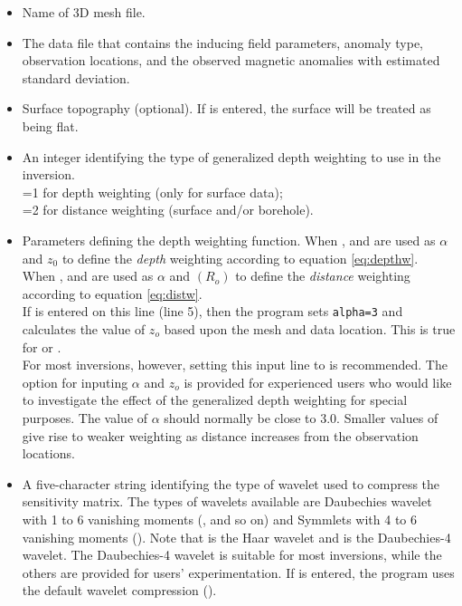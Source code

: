 \begin{itemize}
\item[\fileName{mesh.msh}] Name of 3D mesh file.
\item[\fileName{obs.mag}] The data file that contains the inducing field parameters, anomaly type, observation locations, and the observed magnetic anomalies with estimated standard deviation.
\item[\fileName{topo.dat}] Surface topography (optional). If  is entered, the surface will be treated as being flat.
\item[\fileName{iwt}] An integer identifying the type of generalized depth weighting to use in the inversion. \\
=1 for depth weighting (only for surface data); \\
=2 for distance weighting (surface and/or borehole).
\item[\fileName{alpha,znot}] Parameters defining the depth weighting function.
When ,  and  are used as $\alpha$ and $z_0$ to define the \textit{depth} weighting according to equation \ref{eq:depthw}.\\
When ,  and  are used as $\alpha$ and $(R_o)$ to define the \textit{distance} weighting according to equation \ref{eq:distw}. \\
If  is entered on this line (line 5), then the program sets \texttt{alpha=3} and calculates the value of $z_o$ based upon the mesh and data location. This is true for  or . \\
For most inversions, however, setting this input line to  is recommended. The option for inputing $\alpha$ and $z_o$ is provided for experienced users who would like to investigate the effect of the generalized depth weighting for special purposes. The value of $\alpha$ should normally be close to 3.0. Smaller values of give rise to weaker weighting as distance increases from the observation locations.
\item[\fileName{wvlt}] A five-character string identifying the type of wavelet used to compress the sensitivity matrix. The types of wavelets available are Daubechies wavelet with 1 to 6 vanishing moments (, and so on) and Symmlets with 4 to 6 vanishing moments (). Note that  is the Haar wavelet and  is the Daubechies-4 wavelet. The Daubechies-4
wavelet is suitable for most inversions, while the others are provided for users' experimentation. If  is entered, the program uses the default wavelet compression ().

\end{itemize}
